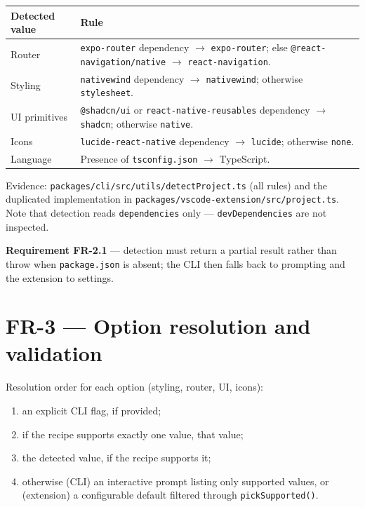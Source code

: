 \begin{longtable}{p{5.2cm}p{8.8cm}}
\toprule
\textbf{Detected value} & \textbf{Rule} \\
\midrule
\endhead
Router & \texttt{expo-router} dependency $\rightarrow$ \texttt{expo-router};
else \texttt{@react-navigation/native} $\rightarrow$ \texttt{react-navigation}. \\
Styling & \texttt{nativewind} dependency $\rightarrow$ \texttt{nativewind};
otherwise \texttt{stylesheet}. \\
UI primitives & \texttt{@shadcn/ui} or \texttt{react-native-reusables} dependency
$\rightarrow$ \texttt{shadcn}; otherwise \texttt{native}. \\
Icons & \texttt{lucide-react-native} dependency $\rightarrow$ \texttt{lucide};
otherwise \texttt{none}. \\
Language & Presence of \texttt{tsconfig.json} $\rightarrow$ TypeScript. \\
\bottomrule
\end{longtable}

Evidence: \texttt{packages/cli/src/utils/detectProject.ts} (all rules) and the
duplicated implementation in \texttt{packages/vscode-extension/src/project.ts}.
Note that detection reads \texttt{dependencies} only --- \texttt{devDependencies}
are not inspected.

\textbf{Requirement FR-2.1} --- detection must return a partial result rather than
throw when \texttt{package.json} is absent; the CLI then falls back to prompting
and the extension to settings.

\section{FR-3 --- Option resolution and validation}

Resolution order for each option (styling, router, UI, icons):

\begin{enumerate}
  \item an explicit CLI flag, if provided;
  \item if the recipe supports exactly one value, that value;
  \item the detected value, if the recipe supports it;
  \item otherwise (CLI) an interactive prompt listing only supported values, or
        (extension) a configurable default filtered through
        \texttt{pickSupported()}.
\end{enumerate}

